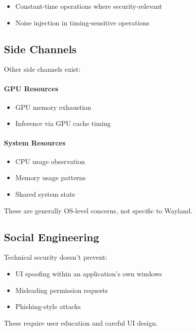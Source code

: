 \begin{itemize}
    \item Constant-time operations where security-relevant
    \item Noise injection in timing-sensitive operations
\end{itemize}

\subsection{Side Channels}

Other side channels exist:

\paragraph{GPU Resources}

\begin{itemize}
    \item GPU memory exhaustion
    \item Inference via GPU cache timing
\end{itemize}

\paragraph{System Resources}

\begin{itemize}
    \item CPU usage observation
    \item Memory usage patterns
    \item Shared system state
\end{itemize}

These are generally OS-level concerns, not specific to Wayland.

\subsection{Social Engineering}

Technical security doesn't prevent:

\begin{itemize}
    \item UI spoofing within an application's own windows
    \item Misleading permission requests
    \item Phishing-style attacks
\end{itemize}

These require user education and careful UI design.

